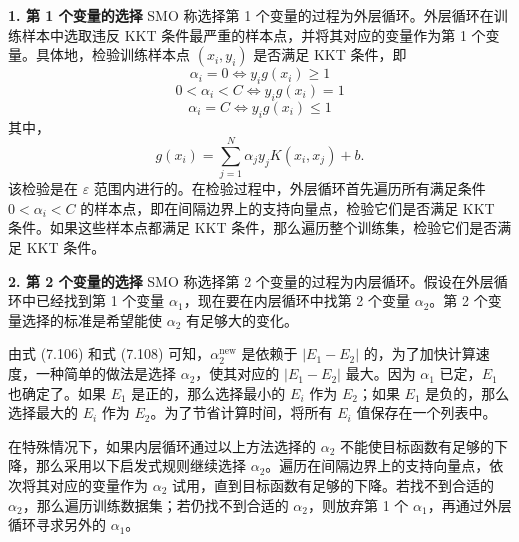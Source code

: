 \documentclass[UTF8,12pt,a4paper,fontset=fandol]{ctexart}
\begin{document}
\noindent\textbf{1. 第 1 个变量的选择}\quad
SMO 称选择第 1 个变量的过程为外层循环。外层循环在训练样本中选取违反 KKT 条件最严重的样本点，并将其对应的变量作为第 1 个变量。具体地，检验训练样本点 $(x_i,y_i)$ 是否满足 KKT 条件，即
\begin{equation}
\alpha_i=0\Leftrightarrow y_i g(x_i)\geq 1
\tag{7.111}
\end{equation}
\begin{equation}
0<\alpha_i<C\Leftrightarrow y_i g(x_i)=1
\tag{7.112}
\end{equation}
\begin{equation}
\alpha_i=C\Leftrightarrow y_i g(x_i)\leq 1
\tag{7.113}
\end{equation}
其中，
\[
g(x_i)=\sum_{j=1}^N\alpha_jy_jK(x_i,x_j)+b.
\]
该检验是在 $\varepsilon$ 范围内进行的。在检验过程中，外层循环首先遍历所有满足条件 $0<\alpha_i<C$ 的样本点，即在间隔边界上的支持向量点，检验它们是否满足 KKT 条件。如果这些样本点都满足 KKT 条件，那么遍历整个训练集，检验它们是否满足 KKT 条件。

\noindent\textbf{2. 第 2 个变量的选择}\quad
SMO 称选择第 2 个变量的过程为内层循环。假设在外层循环中已经找到第 1 个变量 $\alpha_1$，现在要在内层循环中找第 2 个变量 $\alpha_2$。第 2 个变量选择的标准是希望能使 $\alpha_2$ 有足够大的变化。

由式 (7.106) 和式 (7.108) 可知，$\alpha_2^{\mathrm{new}}$ 是依赖于 $|E_1-E_2|$ 的，为了加快计算速度，一种简单的做法是选择 $\alpha_2$，使其对应的 $|E_1-E_2|$ 最大。因为 $\alpha_1$ 已定，$E_1$ 也确定了。如果 $E_1$ 是正的，那么选择最小的 $E_i$ 作为 $E_2$；如果 $E_1$ 是负的，那么选择最大的 $E_i$ 作为 $E_2$。为了节省计算时间，将所有 $E_i$ 值保存在一个列表中。

在特殊情况下，如果内层循环通过以上方法选择的 $\alpha_2$ 不能使目标函数有足够的下降，那么采用以下启发式规则继续选择 $\alpha_2$。遍历在间隔边界上的支持向量点，依次将其对应的变量作为 $\alpha_2$ 试用，直到目标函数有足够的下降。若找不到合适的 $\alpha_2$，那么遍历训练数据集；若仍找不到合适的 $\alpha_2$，则放弃第 1 个 $\alpha_1$，再通过外层循环寻求另外的 $\alpha_1$。
\end{document}
